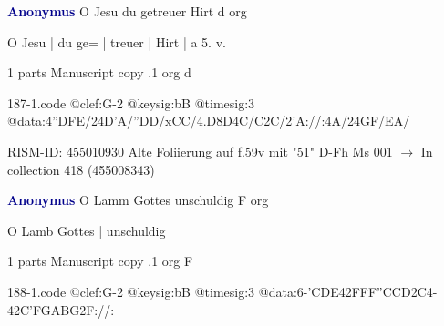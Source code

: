 \documentclass[twocolumn]{book}
\begin{document}
\newline \par \vspace{7pt} \textcolor{darkblue}{\textbf{Anonymus  }}
\newline O Jesu du getreuer Hirt  d  
\newline org
\newline \begin{itshape}[f.59v, at left:] O Jesu | du ge= | treuer | Hirt | a 5. v.\end{itshape} 
\newline \textcolor{darkblue}{}  1 parts  
\newline Manuscript copy
.1  org  d  
\begin{filecontents*}{187-1.code}
@clef:G-2
@keysig:bB
@timesig:3
@data:4''DFE/24D'A/''DD/xCC/4.D8D4C/C2C/2'A://:4A/24GF/EA/
\end{filecontents*}
\newline
%

\newline RISM-ID: 455010930
\newline Alte Foliierung auf f.59v mit "51"
\newline D-Fh  Ms 001
\newline $\rightarrow$ In collection 418 (455008343)

\newline \par \vspace{7pt} \textcolor{darkblue}{\textbf{Anonymus  }}
\newline O Lamm Gottes unschuldig  F  
\newline org
\newline \begin{itshape}[f.42v, at left:] O Lamb Gottes | unschuldig\end{itshape} 
\newline \textcolor{darkblue}{}  1 parts  
\newline Manuscript copy
.1  org  F  
\begin{filecontents*}{188-1.code}
@clef:G-2
@keysig:bB
@timesig:3
@data:6-{'CDE}42FFF''CCD2C4-42C'FGABG2F://:
\end{filecontents*}
\newline
%
\end{document}
